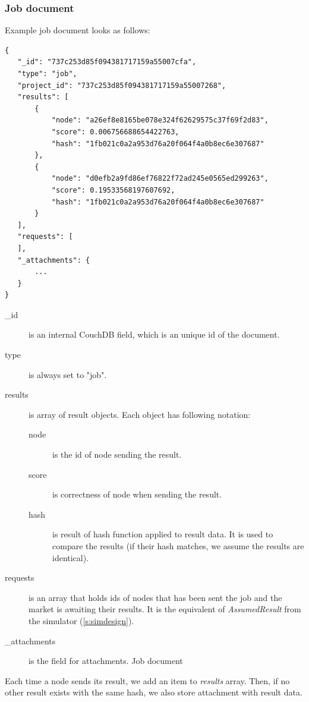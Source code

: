 \subsubsection{Job document}

Example job document looks as follows:

\begin{lstlisting}[caption=Job document in JSON format.]
{
   "_id": "737c253d85f094381717159a55007cfa",
   "type": "job",
   "project_id": "737c253d85f094381717159a55007268",
   "results": [
       {
           "node": "a26ef8e8165be078e324f62629575c37f69f2d83",
           "score": 0.006756688654422763,
           "hash": "1fb021c0a2a953d76a20f064f4a0b8ec6e307687"
       },
       {
           "node": "d0efb2a9fd86ef76822f72ad245e0565ed299263",
           "score": 0.19533568197607692,
           "hash": "1fb021c0a2a953d76a20f064f4a0b8ec6e307687"
       }
   ],
   "requests": [
   ],
   "_attachments": {
       ...
   }
}
\end{lstlisting}

\begin{description}
\item[\_id] is an internal CouchDB field, which is an unique id of the document.
\item[type] is always set to "job".
\item[results] is array of result objects. Each object has following notation:
  \begin{description}
  \item[node] is the id of node sending the result.
  \item[score] is correctness of node when sending the result.
  \item[hash] is result of hash function applied to result data. It is used to compare the results (if their hash matches, we assume the results are identical).
  \end{description}
 \item[requests] is an array that holds ids of nodes that has been sent the job and the market is awaiting their results. It is the equivalent of \emph{AssumedResult} from the simulator (\ref{s:simdesign}).
 \item[\_attachments] is the field for attachments. Job document
\end{description}

Each time a node sends its result, we add an item to \emph{results} array. Then, if no other result exists with the same hash, we also store attachment with result data.

